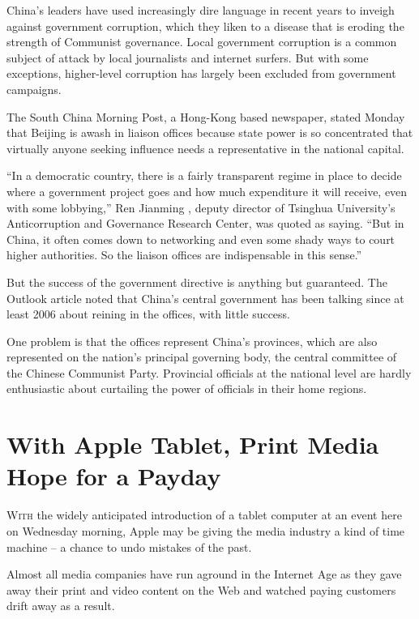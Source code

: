 ﻿\documentclass[12pt]{article}
\begin{document}
China's leaders have used increasingly dire language in recent years to inveigh against government
corruption, which they liken to a disease that is eroding the strength of Communist governance.
Local government corruption is a common subject of attack by local journalists and internet surfers.
But with some exceptions, higher-level corruption has largely been excluded from government
campaigns.

The South China Morning Post, a Hong-Kong based newspaper, stated Monday that Beijing is awash in
liaison offices because state power is so concentrated that virtually anyone seeking influence needs
a representative in the national capital.

``In a democratic country, there is a fairly transparent regime in place to decide where a
government project goes and how much expenditure it will receive, even with some lobbying,'' Ren
Jianming , deputy director of Tsinghua University's Anticorruption and Governance Research Center,
was quoted as saying. ``But in China, it often comes down to networking and even some shady ways to
court higher authorities. So the liaison offices are indispensable in this sense.''

But the success of the government directive is anything but guaranteed. The Outlook article noted
that China's central government has been talking since at least 2006 about reining in the offices,
with little success.

One problem is that the offices represent China's provinces, which are also represented on the
nation's principal governing body, the central committee of the Chinese Communist Party. Provincial
officials at the national level are hardly enthusiastic about curtailing the power of officials in
their home regions.

\section{With Apple Tablet, Print Media Hope for a Payday}

\lettrine{W}{ith} the widely anticipated introduction of a tablet computer
at an event here on Wednesday morning, Apple may be giving the media industry a kind of time machine
-- a chance to undo mistakes of the past.

Almost all media companies have run aground in the Internet Age as they gave away their print and
video content on the Web and watched paying customers drift away as a result.
\end{document}
